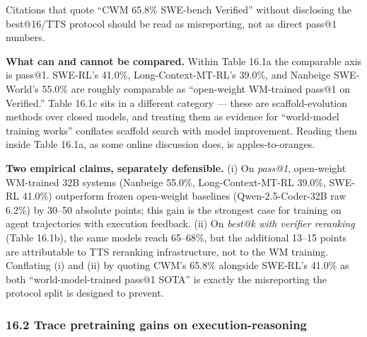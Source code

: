 \documentclass{article}
\begin{document}
Citations that quote ``CWM 65.8\% SWE-bench Verified'' without
disclosing the best@16/TTS protocol should be read as misreporting, not
as direct pass@1 numbers.

\textbf{What can and cannot be compared.} Within Table 16.1a the
comparable axis is pass@1. SWE-RL's 41.0\%, Long-Context-MT-RL's 39.0\%,
and Nanbeige SWE-World's 55.0\% are roughly comparable as ``open-weight
WM-trained pass@1 on Verified.'' Table 16.1c sits in a different
category --- these are scaffold-evolution methods over closed models,
and treating them as evidence for ``world-model training works''
conflates scaffold search with model improvement. Reading them inside
Table 16.1a, as some online discussion does, is apples-to-oranges.

\textbf{Two empirical claims, separately defensible.} (i) On
\emph{pass@1}, open-weight WM-trained 32B systems (Nanbeige 55.0\%,
Long-Context-MT-RL 39.0\%, SWE-RL 41.0\%) outperform frozen open-weight
baselines (Qwen-2.5-Coder-32B raw 6.2\%) by 30--50 absolute points; this
gain is the strongest case for training on agent trajectories with
execution feedback. (ii) On \emph{best@k with verifier reranking} (Table
16.1b), the same models reach 65--68\%, but the additional 13--15 points
are attributable to TTS reranking infrastructure, not to the WM
training. Conflating (i) and (ii) by quoting CWM's 65.8\% alongside
SWE-RL's 41.0\% as both ``world-model-trained pass@1 SOTA'' is exactly
the misreporting the protocol split is designed to prevent.

\hypertarget{trace-pretraining-gains-on-execution-reasoning}{%
\subsubsection{16.2 Trace pretraining gains on
execution-reasoning}\label{trace-pretraining-gains-on-execution-reasoning}}
\end{document}
